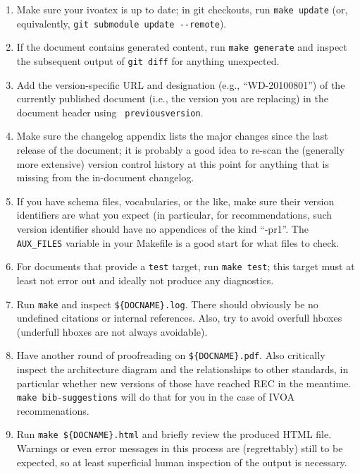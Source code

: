 \documentclass[11pt,a4paper]{ivoa}
\newcommand{\texword}[1]{\texttt{\color{texcolor} #1}}
\begin{document}
\begin{enumerate}
\item Make sure your ivoatex is up to date; in git checkouts, run
\verb|make update| (or, equivalently, 
\verb|git submodule update --remote|).

\item If the document contains generated content, run 
\verb|make generate| 
and inspect the subsequent output of 
\verb|git diff| 
for anything unexpected.

\item Add the version-specific URL and designation (e.g.,
``WD-20100801'') of the currently
published document (i.e., the version you are replacing) in the document
header using \texword{previousversion}.

\item Make sure the changelog appendix lists the major changes since the
last release of the document; it is probably a good idea to re-scan the
(generally more extensive) version control history at this point for
anything that is missing from the in-document changelog.

\item If you have schema files, vocabularies, or the like, make sure
their version identifiers are what you expect (in particular, for
recommendations, such version identifier should have no appendices
of the kind ``-pr1''.  The \verb|AUX_FILES| variable in your Makefile is
a good start for what files to check.

\item For documents that provide a \verb|test| target, run 
\verb|make test|; 
this target must at least not error out and ideally not produce
any diagnostics.

\item Run \verb|make| and inspect \verb|${DOCNAME}.log|.  There should
obviously be no undefined citations or internal references.  Also, try
to avoid overfull hboxes (underfull hboxes are not always avoidable).

\item Have another round of proofreading on \verb|${DOCNAME}.pdf|.  Also
critically inspect the architecture diagram and the relationships to
other standards, in particular whether new versions of those have
reached REC in the meantime. \verb|make bib-suggestions| will do
that for you in the case of IVOA recommenations.

\item Run \verb|make ${DOCNAME}.html| and briefly review the produced
HTML file.  Warnings or even error messages in this process are
(regrettably) still to be expected, so at least superficial human inspection 
of the output is necessary.


\end{enumerate}
\end{document}
